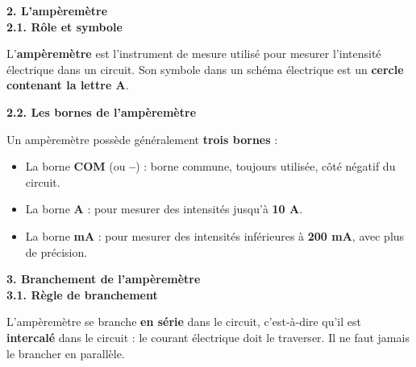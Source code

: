 \documentclass[11pt,a4paper]{article}
\begin{document}
\vfill

\textbf{2. L'ampèremètre} \\

\textbf{2.1. Rôle et symbole}

\begin{tcolorbox}[colback=red!5!white,colframe=red!75!black]
{
L'\textbf{ampèremètre} est l'instrument de mesure utilisé pour mesurer l'intensité électrique dans un circuit. Son symbole dans un schéma électrique est un \textbf{cercle contenant la lettre A}.

\begin{center}
\end{center}
}
\end{tcolorbox}

\vfill 

\textbf{2.2. Les bornes de l'ampèremètre}

Un ampèremètre possède généralement \textbf{trois bornes} :

\begin{itemize}
    \item La borne \textbf{COM} (ou \textbf{--}) : borne commune, toujours utilisée, côté négatif du circuit.
    \item La borne \textbf{A} : pour mesurer des intensités jusqu'à \textbf{10 A}.
    \item La borne \textbf{mA} : pour mesurer des intensités inférieures à \textbf{200 mA}, avec plus de précision.
\end{itemize}

\vfill 

\newpage


\vfill

\textbf{3. Branchement de l'ampèremètre} \\

\textbf{3.1. Règle de branchement}

\begin{tcolorbox}[colback=red!5!white,colframe=red!75!black]
{
L'ampèremètre se branche \textbf{en série} dans le circuit, c'est-à-dire qu'il est \textbf{intercalé} dans le circuit : le courant électrique doit le traverser. Il ne faut jamais le brancher en parallèle.
}
\end{tcolorbox}
\end{document}
